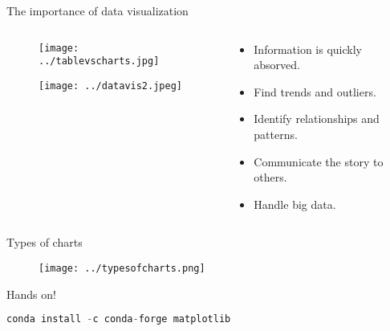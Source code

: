 \documentclass{beamer}
\begin{document}
\begin{frame}{The importance of data visualization}
 
\begin{columns}

\begin{column}[t]{0.55\textwidth}


  \begin{figure}
  \texttt{[image: ../tablevscharts.jpg]}
  \end{figure}
  \begin{figure}
  \texttt{[image: ../datavis2.jpeg]}
  \end{figure}

\end{column}

\begin{column}[t]{0.4\textwidth}

    \begin{itemize}[<+(1)->]

    \item Information is quickly absorved.
    \item Find trends and outliers.
    \item Identify relationships and patterns.
    \item Communicate the story to others.
    \item Handle big data.


    \end{itemize}

\end{column}

\end{columns}
  
\end{frame}


\begin{frame}{Types of charts}

  \begin{figure}
  \texttt{[image: ../typesofcharts.png]}
  \end{figure}
  
\end{frame}


\begin{frame}[fragile]{Hands on!}

        \begin{lstlisting}[language= Python, frame = single, title={Packages to install}]
        conda install -c conda-forge matplotlib 
        \end{lstlisting}
        
\end{frame}
\end{document}
